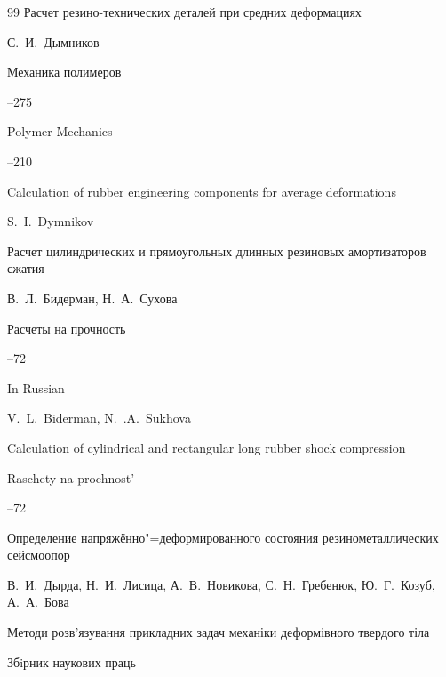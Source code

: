 \begin{thebibliography}{99}
\paper Расчет резино-технических деталей при средних деформациях

\by С.~И.~Дымников

\jour Механика полимеров



--275

\transl

\jour Polymer Mechanics




--210

\paper Calculation of rubber engineering components for average deformations

\by S.~I.~Dymnikov 





\paper Расчет цилиндрических и прямоугольных длинных резиновых амортизаторов сжатия

\by В.~Л.~Бидерман, Н.~А.~Сухова

\jour Расчеты на прочность



--72

\misctransl

\lang In Russian

\by V.~L.~Biderman, N.~.A.~Sukhova

\paper Calculation of cylindrical and rectangular long rubber shock compression

\jour Raschety na prochnost'



--72




\paper Определение напряжённо"=деформированного состояния резинометаллических сейсмоопор

\by  В.~И.~Дырда, Н.~И.~Лисица, А.~В.~Новикова, С.~Н.~Гребенюк, Ю.~Г.~Козуб, А.~А.~Бова

\inbook Методи розв'язування прикладних задач механіки деформівного твердого тіла

\bookinfo Збiрник наукових праць


\end{thebibliography}
